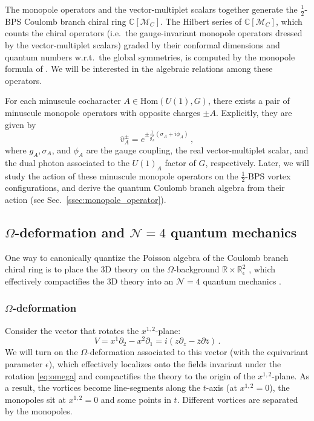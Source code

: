 \documentclass[12pt,a4paper]{article}
\renewcommand{\(}{\left(}
\renewcommand{\)}{\right)}
\renewcommand{\(}{\left(}
\renewcommand{\)}{\right)}
\begin{document}
\medskip

The monopole operators and the vector-multiplet scalars together generate the $\frac{1}{2}$-BPS Coulomb branch  chiral ring $\mathbb{C}[\mathcal{M}_C]$.
The Hilbert series of $\mathbb{C}[\mathcal{M}_C]$, which counts the chiral operators (i.e.\ the gauge-invariant monopole operators dressed by the vector-multiplet scalars) graded by their conformal dimensions and quantum numbers w.r.t.\ the global symmetries, is computed by the monopole formula of \cite{Cremonesi_2014}.
We will be interested in the algebraic relations among these operators. 



For each minuscule cocharacter $A\in \mathrm{Hom}(U(1),G)$, there exists a pair of minuscule monopole operators with opposite charges $\pm A$. Explicitly, they are given by
\begin{equation}
\hat{v}^{\pm}_A=e^{\pm\frac{1}{g_A^2}(\sigma_A+i\phi_A)}\,,
\end{equation}
where $g_A,\sigma_A$, and $\phi_A$ are the gauge coupling, the real vector-multiplet scalar, and the dual photon associated to the $U(1)_A$ factor of $G$, respectively. 
Later, we will study the action of these minuscule monopole operators on the $\frac{1}{2}$-BPS vortex configurations, and derive the quantum Coulomb branch algebra from their action (see Sec.~\ref{ssec:monopole_operator}).



\subsection{\texorpdfstring{$\Omega$-deformation and $\mathcal{N}=4$ quantum mechanics}{Ω-deformation and N=4 quantum mechanics}}\label{ssec:review_vortex_QM}


One way to canonically quantize the Poisson algebra of the Coulomb branch chiral ring is to place the 3D theory on the $\Omega$-background $\mathbb{R}\times \mathbb{R}^2_{\epsilon}$ \cite{Nekrasov:2002qd,Nekrasov_2010}, which effectively compactifies the 3D theory into an $\mathcal{N}=4$ quantum mechanics \cite{Bullimore:2016hdc}.


\subsubsection{\texorpdfstring{$\Omega$-deformation}{Ω-deformation}}\label{sssec:omega_defor}

Consider the vector that rotates the $x^{1,2}$-plane:
\begin{equation}\label{eq:omega}
V=x^1\partial_2-x^2\partial_1=i(z\partial_z-\bar{z}\partial{\bar{z}})\,.
\end{equation}
We will turn on the $\Omega$-deformation associated to this vector (with the equivariant parameter $\epsilon$), which effectively localizes onto the fields invariant under the rotation \eqref{eq:omega} and compactifies the theory to the origin of the $x^{1,2}$-plane. 
As a result, the vortices become line-segments along the $t$-axis (at $x^{1,2}=0$), the monopoles sit at $x^{1,2}=0$ and some points in $t$.
Different vortices are separated by the monopoles. 
\end{document}
